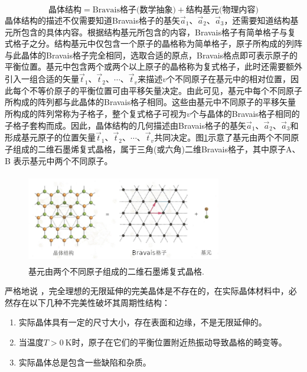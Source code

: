 \begin{displaymath}
	\mbox{晶体结构} = \mbox{Bravais格子(数学抽象)}+ \mbox{结构基元(物理内容)}
\end{displaymath} 
晶体结构的描述不仅需要知道Bravais格子的基矢$\vec a_1$、$\vec a_2$、$\vec a_3$，还需要知道结构基元所包含的具体内容。根据结构基元所包含的内容，Bravais格子有简单格子与复式格子之分。结构基元中仅包含一个原子的晶格称为简单格子，原子所构成的列阵与此晶体的Bravais格子完全相同，选取合适的原点，Bravais格点即可表示原子的平衡位置。基元中包含两个或两个以上原子的晶格称为复式格子，此时还需要额外引入一组合适的矢量$\vec t_1$、$\vec t_2$、$\cdots$、$\vec t_v$来描述$v$个不同原子在基元中的相对位置，因此每个不等价原子的平衡位置可由平移矢量决定。由此可见，基元中每个不同原子所构成的阵列都与此晶体的Bravais格子相同。这些由基元中不同原子的平移矢量所构成的阵列常称为子格子，整个复式格子可视为$v$个与晶体的Bravais格子相同的子格子套构而成。因此，晶体结构的几何描述由Bravais格子的基矢$\vec a_1$、$\vec a_2$、$\vec a_3$和形成基元原子的位置矢量$\vec t_1$、$\vec t_2$、$\cdots$、$\vec t_v$共同决定。图\ref{Fig:Graphe_Bravais-Lattice}示意了基元由两个不同原子组成的二维石墨烯复式晶格，属于三角(或六角)二维Bravais格子，其中原子A、B 表示基元中两个不同原子。
\begin{figure}[h!]
\centering
\vspace*{-0.05in}
\includegraphics[height=1.55in,width=3.35in,viewport=0 0 80 40,clip]{Figures/Graphe_Bravais-Lattice.png}
\caption{\small \textrm{基元由两个不同原子组成的二维石墨烯复式晶格.}}%
\label{Fig:Graphe_Bravais-Lattice}
\end{figure}

严格地说 ，完全理想的无限延伸的完美晶体是不存在的，在实际晶体材料中，必然存在以下几种不完美性破坏其周期性结构：
\begin{enumerate}
	\item 实际晶体具有一定的尺寸大小，存在表面和边缘，不是无限延伸的。
	\item 当温度$T>0~\mathrm{K}$时，原子在它们的平衡位置附近热振动导致晶格的畸变等。
	\item 实际晶体总是包含一些缺陷和杂质。
\end{enumerate}

